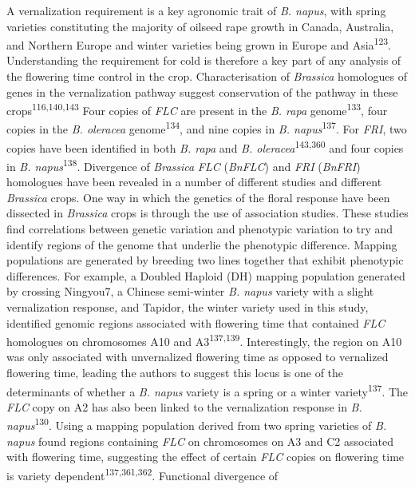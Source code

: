 \documentclass[12pt,]{book}
\begin{document}
A vernalization requirement is a key agronomic trait of \emph{B. napus},
with spring varieties constituting the majority of oilseed rape growth
in Canada, Australia, and Northern Europe and winter varieties being
grown in Europe and Asia\textsuperscript{123}. Understanding the
requirement for cold is therefore a key part of any analysis of the
flowering time control in the crop. Characterisation of \emph{Brassica}
homologues of genes in the vernalization pathway suggest conservation of
the pathway in these crops\textsuperscript{116,140,143} Four copies of
\emph{FLC} are present in the \emph{B. rapa}
genome\textsuperscript{133}, four copies in the \emph{B. oleracea}
genome\textsuperscript{134}, and nine copies in \emph{B.
napus}\textsuperscript{137}. For \emph{FRI}, two copies have been
identified in both \emph{B. rapa} and \emph{B.
oleracea}\textsuperscript{143,360} and four copies in \emph{B.
napus}\textsuperscript{138}. Divergence of \emph{Brassica} \emph{FLC}
(\emph{BnFLC}) and \emph{FRI} (\emph{BnFRI}) homologues have been
revealed in a number of different studies and different \emph{Brassica}
crops. One way in which the genetics of the floral response have been
dissected in \emph{Brassica} crops is through the use of association
studies. These studies find correlations between genetic variation and
phenotypic variation to try and identify regions of the genome that
underlie the phenotypic difference. Mapping populations are generated by
breeding two lines together that exhibit phenotypic differences. For
example, a Doubled Haploid (DH) mapping population generated by crossing
Ningyou7, a Chinese semi-winter \emph{B. napus} variety with a slight
vernalization response, and Tapidor, the winter variety used in this
study, identified genomic regions associated with flowering time that
contained \emph{FLC} homologues on chromosomes A10 and
A3\textsuperscript{137,139}. Interestingly, the region on A10 was only
associated with unvernalized flowering time as opposed to vernalized
flowering time, leading the authors to suggest this locus is one of the
determinants of whether a \emph{B. napus} variety is a spring or a
winter variety\textsuperscript{137}. The \emph{FLC} copy on A2 has also
been linked to the vernalization response in \emph{B.
napus}\textsuperscript{130}. Using a mapping population derived from two
spring varieties of \emph{B. napus} found regions containing \emph{FLC}
on chromosomes on A3 and C2 associated with flowering time, suggesting
the effect of certain \emph{FLC} copies on flowering time is variety
dependent\textsuperscript{137,361,362}. Functional divergence of
\end{document}
